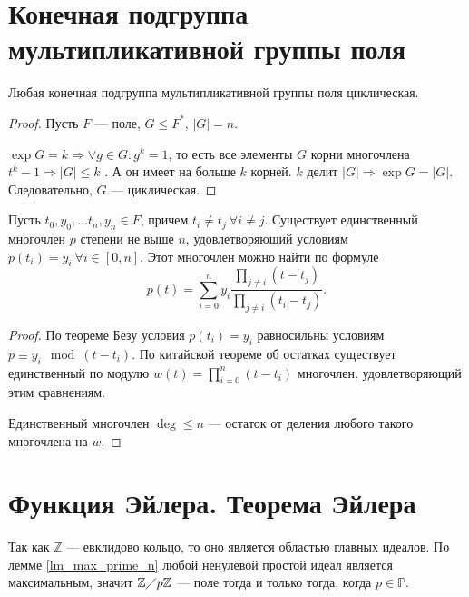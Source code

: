 \documentclass[11pt]{book}
\newcommand{\Z}{\mathbb{Z}}
\newcommand{\Pm}{\mathbb{P}}
\newcommand{\po}{\diagup}
\renewcommand{\le}{\leqslant}
\theoremstyle{definition}
\theoremstyle{plain}
\theoremstyle{plain}
\theoremstyle{definition}
\theoremstyle{remark}
\begin{document}
\section{Конечная подгруппа мультипликативной группы поля}
\begin{thm}\label{th_end}
    Любая конечная подгруппа мультипликативной группы поля циклическая.
\end{thm}
\begin{proof}
    Пусть $ F$ --- поле, $ G \le F^{*}$, $ |G| =n $.

    $ \exp G = k \Longrightarrow \forall g \in  G: g^{k } = 1$, то есть все элементы $ G$ корни многочлена $ t ^{k} -1 \Longrightarrow  |G| \le k$ . А он имеет на больше  $ k$ корней.
    $ k$ делит  $ |G| \Longrightarrow  \exp G = |G|$. Следовательно, $ G$ --- циклическая.
\end{proof}
\begin{thm}
    Пусть $ t_0, y_0, \ldots t_n, y_n \in F$, причем $ t_i \ne  t_j ~ \forall i \ne j$. Существует единственный многочлен $ p$ степени не выше  $ n$, удовлетворяющий условиям  $ p(t_i) = y_i ~ \forall i \in [0, n]$. Этот многочлен можно найти по формуле
    \[
	p(t) = \sum_{i = 0}^{n} y_i \frac{\prod_{j \ne  i}(t-t_j)}{\prod_{j \ne  i}(t_i - t_j)}
    .\]
\end{thm}
\begin{proof}
    По теореме Безу условия $ p(t_i) = y_i $  равносильны условиям  $ p \equiv y_{i} \mod (t - t_i)$. По китайской теореме об остатках существует единственный по модулю $ w(t) = \prod\limits_{i = 0}^{n}(t-t_i)$ многочлен, удовлетворяющий этим сравнениям.

    Единственный многочлен $ \deg \le n $ --- остаток от деления любого такого многочлена на $ w$.
\end{proof}
\section{Функция Эйлера. Теорема Эйлера}
Так как $ \Z$  --- евклидово кольцо, то оно является областью главных идеалов. По лемме \ref{lm_max_prime_n} любой ненулевой простой идеал является максимальным, значит $ \Z \po p\Z$ --- поле  тогда и только тогда, когда $ p \in \Pm$.
\end{document}

